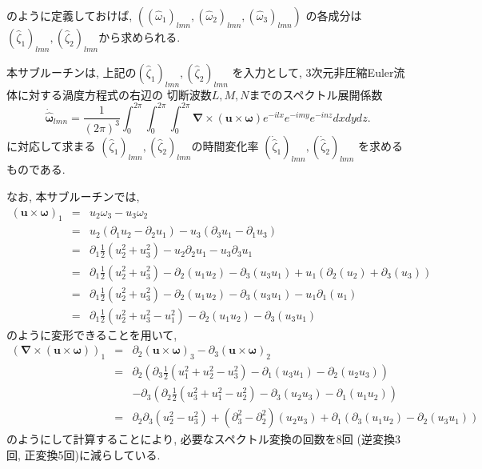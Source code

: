 \documentclass[a4j,fleqn]{jarticle}
\begin{document}
\begin{enumerate}
\begin{quote}
\begin{description}
\end{description}
\end{quote}
のように定義しておけば, 
$((\hat{\omega}_1)_{lmn},(\hat{\omega}_2)_{lmn},(\hat{\omega}_3)_{lmn})$
の各成分は$(\hat{\zeta}_1)_{lmn},(\hat{\zeta}_2)_{lmn}$から求められる.

本サブルーチンは, 上記の$(\hat{\zeta}_1)_{lmn},(\hat{\zeta}_2)_{lmn}$
を入力として,
3次元非圧縮Euler流体に対する渦度方程式の右辺の
切断波数$L,M,N$までのスペクトル展開係数
\[
\dot{\hat{\boldsymbol{\omega}}}_{lmn}
=
\frac1{(2\pi)^3}\int^{2\pi}_0\int^{2\pi}_0\int^{2\pi}_0
\boldsymbol{\nabla}\times(\boldsymbol{u}\times\boldsymbol{\omega})
    e^{-ilx}e^{-imy}e^{-inz}dxdydz.
\]
に対応して求まる
$(\hat{\zeta}_1)_{lmn},(\hat{\zeta}_2)_{lmn}$の時間変化率
$(\dot{\hat{\zeta}}_1)_{lmn},(\dot{\hat{\zeta}}_2)_{lmn}$
を求めるものである.

なお, 本サブルーチンでは, 
\begin{eqnarray*}
(\boldsymbol{u}\times\boldsymbol{\omega})_1
&=&u_2\omega_3-u_3\omega_2 \\
&=&u_2(\partial_1 u_2-\partial_2 u_1)-u_3(\partial_3 u_1-\partial_1 u_3) \\
&=&\partial_1\frac12(u_2^2+u_3^2)-u_2\partial_2 u_1 -u_3\partial_3 u_1 \\
&=&\partial_1\frac12(u_2^2+u_3^2)-\partial_2(u_1u_2)-\partial_3(u_3u_1)
   +u_1(\partial_2(u_2)+\partial_3(u_3))\\
&=&\partial_1\frac12(u_2^2+u_3^2)-\partial_2(u_1u_2)-\partial_3(u_3u_1)
   -u_1\partial_1(u_1)\\
&=&\partial_1\frac12(u_2^2+u_3^2-u_1^2)-\partial_2(u_1u_2)-\partial_3(u_3u_1)
\end{eqnarray*}
のように変形できることを用いて,
\begin{eqnarray*}
(\boldsymbol{\nabla}\times(\boldsymbol{u}\times\boldsymbol{\omega}))_1
&=&\partial_2(\boldsymbol{u}\times\boldsymbol{\omega})_3
  -\partial_3(\boldsymbol{u}\times\boldsymbol{\omega})_2\\
&=&\partial_2
\left(\partial_3\frac12(u_1^2+u_2^2-u_3^2)
       -\partial_1(u_3u_1)-\partial_2(u_2u_3)\right)\\
& & -\partial_3
\left(\partial_2\frac12(u_3^2+u_1^2-u_2^2)
       -\partial_3(u_2u_3)-\partial_1(u_1u_2)\right)\\
&=&\partial_2\partial_3(u_2^2-u_3^2)
   +(\partial_3^2-\partial_2^2)(u_2u_3)
   +\partial_1\left(\partial_3(u_1u_2)-\partial_2(u_3u_1)\right)
\end{eqnarray*}
のようにして計算することにより, 必要なスペクトル変換の回数を8回
(逆変換3回, 正変換5回)に減らしている.


\end{enumerate}
\end{document}
